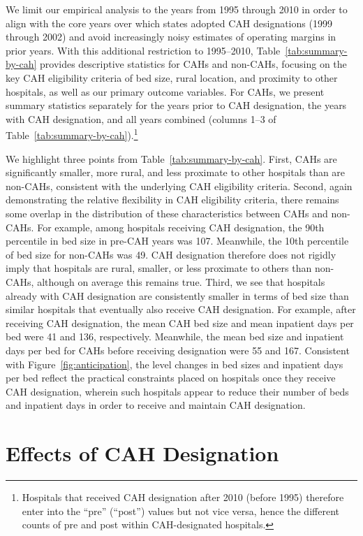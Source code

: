 \documentclass[a4paper, 12pt, twoside]{article}
\begin{document}
We limit our empirical analysis to the years from 1995 through 2010 in order to align with the core years over which states adopted CAH designations (1999 through 2002) and avoid increasingly noisy estimates of operating margins in prior years. With this additional restriction to 1995--2010, Table~\ref{tab:summary-by-cah} provides descriptive statistics for CAHs and non-CAHs, focusing on the key CAH eligibility criteria of bed size, rural location, and proximity to other hospitals, as well as our primary outcome variables. For CAHs, we present summary statistics separately for the years prior to CAH designation, the years with CAH designation, and all years combined (columns 1--3 of Table~\ref{tab:summary-by-cah}).\footnote{Hospitals that received CAH designation after 2010 (before 1995) therefore enter into the ``pre'' (``post'') values but not vice versa, hence the different counts of pre and post within CAH-designated hospitals.} 

We highlight three points from Table~\ref{tab:summary-by-cah}. First, CAHs are significantly smaller, more rural, and less proximate to other hospitals than are non-CAHs, consistent with the underlying CAH eligibility criteria. Second, again demonstrating the relative flexibility in CAH eligibility criteria, there remains some overlap in the distribution of these characteristics between CAHs and non-CAHs. For example, among hospitals receiving CAH designation, the 90th percentile in bed size in pre-CAH years was 107. Meanwhile, the 10th percentile of bed size for non-CAHs was 49. CAH designation therefore does not rigidly imply that hospitals are rural, smaller, or less proximate to others than non-CAHs, although on average this remains true. Third, we see that hospitals already with CAH designation are consistently smaller in terms of bed size than similar hospitals that eventually also receive CAH designation. For example, after receiving CAH designation, the mean CAH bed size and mean inpatient days per bed were 41 and 136, respectively. Meanwhile, the mean bed size and inpatient days per bed for CAHs before receiving designation were 55 and 167. Consistent with Figure~\ref{fig:anticipation}, the level changes in bed sizes and inpatient days per bed reflect the practical constraints placed on hospitals once they receive CAH designation, wherein such hospitals appear to reduce their number of beds and inpatient days in order to receive and maintain CAH designation.

\section{Effects of CAH Designation}
\label{sec:design}
\end{document}
